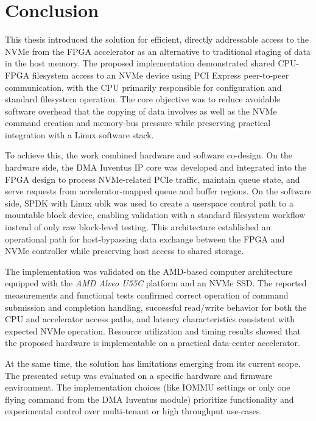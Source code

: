 \chapter*{Conclusion}
{}

This thesis introduced the solution for efficient, directly addressable access to the NVMe from the
FPGA accelerator as an alternative to traditional staging of data in the host memory. The
proposed implementation demonstrated shared CPU-FPGA filesystem access to an NVMe device using PCI
Express peer-to-peer communication, with the CPU primarily responsible for configuration and
standard filesystem operation. The core objective was to reduce avoidable software overhead that the
copying of data involves as well as the NVMe command creation and memory-bus pressure while
preserving practical integration with a Linux software stack.

To achieve this, the work combined hardware and software co-design. On the hardware side, the DMA
Iuventus IP core was developed and integrated into the FPGA design to process NVMe-related PCIe
traffic, maintain queue state, and serve requests from accelerator-mapped queue and buffer
regions. On the software side, SPDK with Linux ublk was used to create a userspace control path to
a mountable block device, enabling validation with a standard filesystem workflow instead of only
raw block-level testing. This architecture established an operational path for host-bypassing data
exchange between the FPGA and NVMe controller while preserving host access to shared storage.

The implementation was validated on the AMD-based computer architecture equipped with the \emph{AMD
Alveo U55C} platform and an NVMe SSD. The reported measurements and functional tests confirmed
correct operation of command submission and completion handling, successful read/write behavior for
both the CPU and accelerator access paths, and latency characteristics consistent with expected NVMe
operation. Resource utilization and timing results showed that the proposed hardware is
implementable on a practical data-center accelerator.

At the same time, the solution has limitations emerging from its current scope. The presented setup
was evaluated on a specific hardware and firmware environment. The implementation choices (like
IOMMU settings or only one flying command from the DMA Iuventus module) prioritize functionality and
experimental control over multi-tenant or high throughput use-cases.

